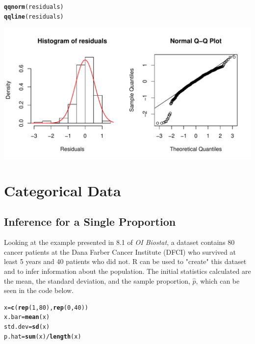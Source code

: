\documentclass{report}\usepackage[]{graphicx}\usepackage[]{color}
\makeatletter
\def\maxwidth{ %
  \ifdim\Gin@nat@width>\linewidth
    \linewidth
  \else
    \Gin@nat@width
  \fi
}
\newcommand{\hlnum}[1]{\textcolor[rgb]{0.686,0.059,0.569}{#1}}%
\newcommand{\hlopt}[1]{\textcolor[rgb]{0,0,0}{#1}}%
\newcommand{\hlstd}[1]{\textcolor[rgb]{0.345,0.345,0.345}{#1}}%
\newcommand{\hlkwb}[1]{\textcolor[rgb]{0.69,0.353,0.396}{#1}}%
\newcommand{\hlkwd}[1]{\textcolor[rgb]{0.737,0.353,0.396}{\textbf{#1}}}%
\newenvironment{kframe}{%
 \def\at@end@of@kframe{}%
 \ifinner\ifhmode%
  \def\at@end@of@kframe{\end{minipage}}%
  \begin{minipage}{\columnwidth}%
 \fi\fi%
 \def\FrameCommand##1{\hskip\@totalleftmargin \hskip-\fboxsep
 \colorbox{shadecolor}{##1}\hskip-\fboxsep
     \hskip-\linewidth \hskip-\@totalleftmargin \hskip\columnwidth}%
 \MakeFramed {\advance\hsize-\width
   \@totalleftmargin\z@ \linewidth\hsize
   \@setminipage}}%
 {\par\unskip\endMakeFramed%
 \at@end@of@kframe}
\newenvironment{knitrout}{}{} %
\makeatother
\begin{document}
\begin{knitrout}
\begin{kframe}
\begin{alltt}
\hlkwd{qqnorm}\hlstd{(residuals)}
\hlkwd{qqline}\hlstd{(residuals)}
\end{alltt}
\end{kframe}

{\centering \includegraphics[width=\maxwidth]{figure/unnamed-chunk-121-1} 

}



\end{knitrout}


\newpage
\chapter{Categorical Data}
\minitoc


\section{Inference for a Single Proportion}
Looking at the example presented in 8.1 of \textit{OI Biostat}, a dataset contains 80 cancer patients at the Dana Farber Cancer Institute (DFCI) who survived at least 5 years and 40 patients who did not.  \textsf{R} can be used to "create" this dataset and to infer information about the population.  The initial statistics calculated are the mean, the standard deviation, and the sample proportion, $\hat{p}$, which can be seen in the code below.  

\begin{knitrout}
\color{fgcolor}\begin{kframe}
\begin{alltt}
\hlstd{x} \hlkwb{=} \hlkwd{c}\hlstd{(}\hlkwd{rep}\hlstd{(}\hlnum{1}\hlstd{,}\hlnum{80}\hlstd{),}\hlkwd{rep}\hlstd{(}\hlnum{0}\hlstd{,}\hlnum{40}\hlstd{))}
\hlstd{x.bar} \hlkwb{=} \hlkwd{mean}\hlstd{(x)}
\hlstd{std.dev} \hlkwb{=} \hlkwd{sd}\hlstd{(x)}
\hlstd{p.hat} \hlkwb{=} \hlkwd{sum}\hlstd{(x)}\hlopt{/}\hlkwd{length}\hlstd{(x)}
\end{alltt}
\end{kframe}
\end{knitrout}
\end{document}
